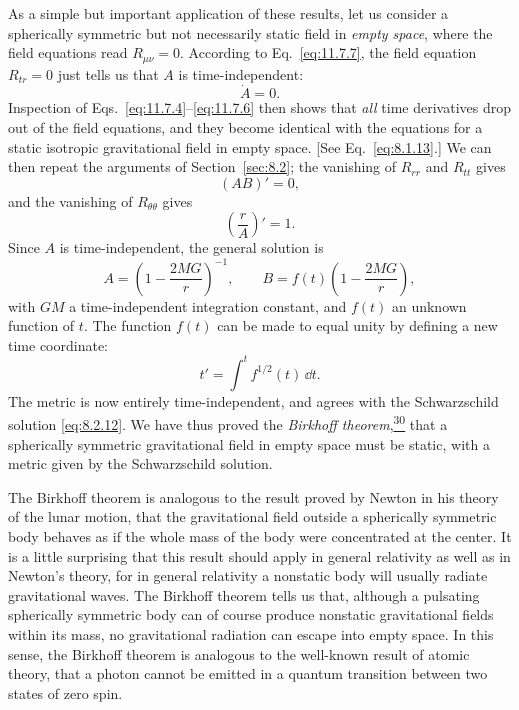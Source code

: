 As a simple but important application of these results, let us consider a
spherically symmetric but not necessarily static field in \emph{empty space},
where the field equations read \(R_{\mu\nu}=0\). According to
Eq.~\eqref{eq:11.7.7}, the field equation \(R_{tr}=0\) just tells us that
\(A\) is time-independent:
\[
  \dot A=0.
\]
Inspection of Eqs.~\eqref{eq:11.7.4}--\eqref{eq:11.7.6} then shows that
\emph{all} time derivatives drop out of the field equations, and they become
identical with the equations for a static isotropic gravitational field in
empty space. [See Eq.~\eqref{eq:8.1.13}.] We can then repeat the arguments
of Section~\ref{sec:8.2}; the vanishing of \(R_{rr}\) and \(R_{tt}\) gives
\[
  (AB)'=0,
\]
and the vanishing of \(R_{\theta\theta}\) gives
\[
  \left(\frac rA\right)'=1.
\]
Since \(A\) is time-independent, the general solution is
\[
  A=\left(1-\frac{2MG}{r}\right)^{-1},
  \qquad
  B=f(t)\left(1-\frac{2MG}{r}\right),
\]
with \(GM\) a time-independent integration constant, and \(f(t)\) an unknown
function of \(t\). The function \(f(t)\) can be made to equal unity by
defining a new time coordinate:
\[
  t'=\int^t f^{1/2}(t)\,\dd t.
\]
The metric is now entirely time-independent, and agrees with the Schwarzschild
solution \eqref{eq:8.2.12}. We have thus proved the \emph{Birkhoff
theorem},\hyperref[ch11-ref-30]{\textsuperscript{30}} that a spherically
symmetric gravitational field in empty space must be static, with a metric
given by the Schwarzschild solution.

The Birkhoff theorem is analogous to the result proved by Newton in his theory
of the lunar motion, that the gravitational field outside a spherically
symmetric body behaves as if the whole mass of the body were concentrated at
the center. It is a little surprising that this result should apply in general
relativity as well as in Newton's theory, for in general relativity a nonstatic
body will usually radiate gravitational waves. The Birkhoff theorem tells us
that, although a pulsating spherically symmetric body can of course produce
nonstatic gravitational fields within its mass, no gravitational radiation
can escape into empty space. In this sense, the Birkhoff theorem is analogous
to the well-known result of atomic theory, that a photon cannot be emitted in
a quantum transition between two states of zero spin.

